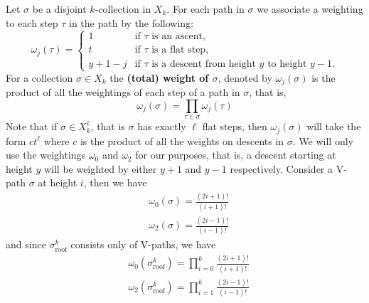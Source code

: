 \documentclass[11pt]{article}
\theoremstyle{mythm}
\begin{document}
Let $\sigma$ be a disjoint $k$-collection in $X_k$. For each path in $\sigma$ we associate a weighting to each step $\tau$ in the path by the following:
\begin{equation*}
\omega_j(\tau) = \begin{cases} 
1 &\text{if $\tau$ is an ascent,} \\
t &\text{if $\tau$ is a flat step,} \\
y+1-j &\text{if $\tau$ is a descent from height $y$ to height $y-1$.}
\end{cases}
\end{equation*}
For a collection $\sigma\in X_k$ the \textbf{(total) weight of $\sigma$}, denoted by $\omega_j(\sigma)$ is the product of all the weightings of each step of a path in $\sigma$, that is,
\begin{equation*}
\omega_j(\sigma) = \prod\limits_{\tau\in\sigma}\omega_j(\tau)
\end{equation*}
Note that if $\sigma \in X_k^\ell$, that is $\sigma$ has exactly $\ell$ flat steps, then $\omega_j(\sigma)$ will take the form $ct^\ell$ where $c$ is the product of all the weights on descents in $\sigma$. We will only use the weightings $\omega_0$ and $\omega_2$ for our purposes, that is, a descent starting at height $y$ will be weighted by either $y+1$ and $y-1$ respectively. Consider a V-path $\sigma$ at height $i$, then we have
\begin{align*}
&\omega_0(\sigma) = \frac{(2i+1)!}{(i+1)!} \\
&\omega_2(\sigma) = \frac{(2i-1)!}{(i-1)!}
\end{align*}
and since $\sigma_{\text{roof}}^k$ consists only of V-paths, we have
\begin{align*}
&\omega_0\left(\sigma_{\text{roof}}^k\right) = \prod\limits_{i=0}^k\frac{(2i+1)!}{(i+1)!} \\
&\omega_2\left(\sigma_{\text{roof}}^k\right) = \prod\limits_{i=1}^k\frac{(2i-1)!}{(i-1)!} \\
\end{align*}
\end{document}
